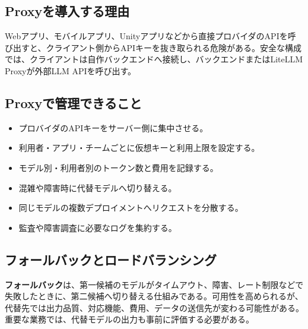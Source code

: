 \documentclass[a4paper,11pt]{jsarticle}
\begin{document}
\subsection{Proxyを導入する理由}

Webアプリ、モバイルアプリ、Unityアプリなどから直接プロバイダのAPIを呼び出すと、クライアント側からAPIキーを抜き取られる危険がある。安全な構成では、クライアントは自作バックエンドへ接続し、バックエンドまたはLiteLLM Proxyが外部LLM APIを呼び出す。

\begin{center}
\end{center}

\subsection{Proxyで管理できること}

\begin{itemize}
  \item プロバイダのAPIキーをサーバー側に集中させる。
  \item 利用者・アプリ・チームごとに仮想キーと利用上限を設定する。
  \item モデル別・利用者別のトークン数と費用を記録する。
  \item 混雑や障害時に代替モデルへ切り替える。
  \item 同じモデルの複数デプロイメントへリクエストを分散する。
  \item 監査や障害調査に必要なログを集約する。
\end{itemize}

\subsection{フォールバックとロードバランシング}

\textbf{フォールバック}は、第一候補のモデルがタイムアウト、障害、レート制限などで失敗したときに、第二候補へ切り替える仕組みである。可用性を高められるが、代替先では出力品質、対応機能、費用、データの送信先が変わる可能性がある。重要な業務では、代替モデルの出力も事前に評価する必要がある。
\end{document}
